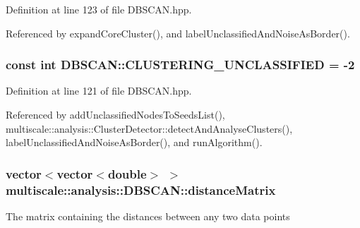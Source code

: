\-Definition at line 123 of file \-D\-B\-S\-C\-A\-N.\-hpp.



\-Referenced by expand\-Core\-Cluster(), and label\-Unclassified\-And\-Noise\-As\-Border().

\hypertarget{classmultiscale_1_1analysis_1_1DBSCAN_a6f60961639281a807b63650faf01511b}{
\subsubsection[{\-C\-L\-U\-S\-T\-E\-R\-I\-N\-G\-\_\-\-U\-N\-C\-L\-A\-S\-S\-I\-F\-I\-E\-D}]{\setlength{\rightskip}{0pt plus 5cm}const int {\bf \-D\-B\-S\-C\-A\-N\-::\-C\-L\-U\-S\-T\-E\-R\-I\-N\-G\-\_\-\-U\-N\-C\-L\-A\-S\-S\-I\-F\-I\-E\-D} = -\/2}}\label{classmultiscale_1_1analysis_1_1DBSCAN_a6f60961639281a807b63650faf01511b}


\-Definition at line 121 of file \-D\-B\-S\-C\-A\-N.\-hpp.



\-Referenced by add\-Unclassified\-Nodes\-To\-Seeds\-List(), multiscale\-::analysis\-::\-Cluster\-Detector\-::detect\-And\-Analyse\-Clusters(), label\-Unclassified\-And\-Noise\-As\-Border(), and run\-Algorithm().

\hypertarget{classmultiscale_1_1analysis_1_1DBSCAN_a863a8b90ff30d401795264a246a09147}{
\subsubsection[{distance\-Matrix}]{\setlength{\rightskip}{0pt plus 5cm}vector$<$vector$<$double$>$ $>$ {\bf multiscale\-::analysis\-::\-D\-B\-S\-C\-A\-N\-::distance\-Matrix}}}\label{classmultiscale_1_1analysis_1_1DBSCAN_a863a8b90ff30d401795264a246a09147}
\-The matrix containing the distances between any two data points 

